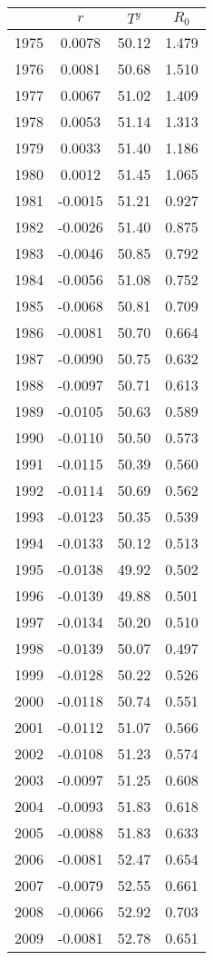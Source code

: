 \begin{tabular}{cccc}
  \hline
 & $r$ & $T^y$ & $R_0$ \\ 
  \hline
1975 & 0.0078 & 50.12 & 1.479 \\ 
  1976 & 0.0081 & 50.68 & 1.510 \\ 
  1977 & 0.0067 & 51.02 & 1.409 \\ 
  1978 & 0.0053 & 51.14 & 1.313 \\ 
  1979 & 0.0033 & 51.40 & 1.186 \\ 
  1980 & 0.0012 & 51.45 & 1.065 \\ 
  1981 & -0.0015 & 51.21 & 0.927 \\ 
  1982 & -0.0026 & 51.40 & 0.875 \\ 
  1983 & -0.0046 & 50.85 & 0.792 \\ 
  1984 & -0.0056 & 51.08 & 0.752 \\ 
  1985 & -0.0068 & 50.81 & 0.709 \\ 
  1986 & -0.0081 & 50.70 & 0.664 \\ 
  1987 & -0.0090 & 50.75 & 0.632 \\ 
  1988 & -0.0097 & 50.71 & 0.613 \\ 
  1989 & -0.0105 & 50.63 & 0.589 \\ 
  1990 & -0.0110 & 50.50 & 0.573 \\ 
  1991 & -0.0115 & 50.39 & 0.560 \\ 
  1992 & -0.0114 & 50.69 & 0.562 \\ 
  1993 & -0.0123 & 50.35 & 0.539 \\ 
  1994 & -0.0133 & 50.12 & 0.513 \\ 
  1995 & -0.0138 & 49.92 & 0.502 \\ 
  1996 & -0.0139 & 49.88 & 0.501 \\ 
  1997 & -0.0134 & 50.20 & 0.510 \\ 
  1998 & -0.0139 & 50.07 & 0.497 \\ 
  1999 & -0.0128 & 50.22 & 0.526 \\ 
  2000 & -0.0118 & 50.74 & 0.551 \\ 
  2001 & -0.0112 & 51.07 & 0.566 \\ 
  2002 & -0.0108 & 51.23 & 0.574 \\ 
  2003 & -0.0097 & 51.25 & 0.608 \\ 
  2004 & -0.0093 & 51.83 & 0.618 \\ 
  2005 & -0.0088 & 51.83 & 0.633 \\ 
  2006 & -0.0081 & 52.47 & 0.654 \\ 
  2007 & -0.0079 & 52.55 & 0.661 \\ 
  2008 & -0.0066 & 52.92 & 0.703 \\ 
  2009 & -0.0081 & 52.78 & 0.651 \\ 
   \hline
\end{tabular}
